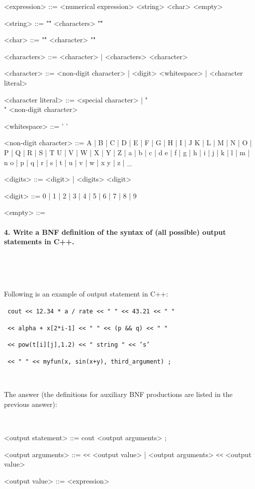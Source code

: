 \documentclass{article}
\begin{document}
\begin{grammar}
		<expression> ::= <numerical expression>
					\alt <string>
					\alt <char>
					\alt <character literal>
					\alt <empty>
					
		<string> ::= "\"" <characters> "\""
		
		<char> ::= "\'" <character> "\'"
		
		<characters> ::= <character> | <characters> <character>
		
		<character> ::= <non-digit character> | <digit>
		           \alt <whitespace> | <character literal>
		
		<character literal> ::= <special character> | "\\" <non-digit character>
		
		<whitespace> ::= ' '
		
		<non-digit character> ::= A | B | C | D | E | F | G | H | I | J
			  				 \alt K | L | M | N | O | P | Q | R | S | T 
			   			     \alt U | V | W | X | Y | Z | a | b | c | d 
			  				 \alt e | f | g | h | i | j | k | l | m | n
			   				 \alt o | p | q | r | s | t | u | v | w | x 
			  				 \alt y | z | _
		
		<digits> ::= <digit> | <digits> <digit>
		
		<digit> ::= 0 | 1 | 2 | 3 | 4 | 5 | 6 | 7 | 8 | 9
				
		<empty> ::= \

	\end{grammar}
	

	
	
	\rmfamily
	
	\paragraph{4. Write a BNF definition of the syntax of (all possible) output statements in C++. }\
	
	\rmfamily\

	
		Following is an example of output statement in C++:
		\newline

	
		\texttt{ cout << 12.34 * a / rate << " " << 43.21 << " " }
		
		\texttt{ 	  << alpha + x[2*i-1] << " " << (p \&\& q) << " " }
		
		\texttt{      << pow(t[i][j],1.2) << " string " << 's' }
		
		\texttt{      << " " << myfun(x, sin(x+y), third_argument) ; } 
		
		\rmfamily\
		
		
		The answer (the definitions for auxiliary BNF productions are listed in the previous answer):
		
	\ttfamily\
	\begin{grammar}
	
		<output statement> ::= cout <output arguments> ;
		
		<output arguments> ::= \lstinline[language=bash]/<</ <output value> | <output arguments> \lstinline[language=bash]/<</ <output value>
		
		<output value> 	   ::= <expression>
		
	\end{grammar}
	
\end{document}
